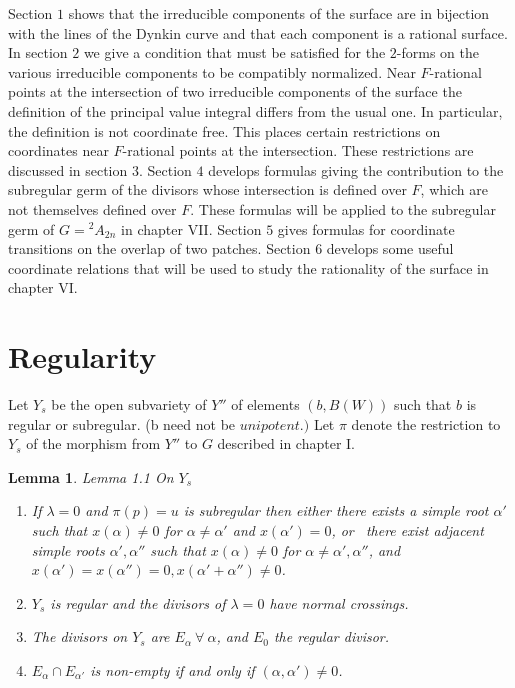 \documentclass{memo-l}
\newtheorem{lemma}[theorem]{Lemma}
\theoremstyle{definition}
\theoremstyle{remark}
\numberwithin{section}{chapter}
\numberwithin{equation}{chapter}
\begin{document}
   Section $1$ shows that the irreducible components of the surface are in
bijection with the lines of the Dynkin curve and that each component is a
rational surface.  In section $2$ we give a condition that must be
satisfied for the $2$-forms on the various irreducible components to be
compatibly normalized.  Near $F$-rational points at the intersection of two
irreducible components of the surface the definition of the principal value
integral differs from the usual one.  In particular, the definition is not
coordinate free.  This places certain restrictions on coordinates near
$F$-rational points at the intersection.  These restrictions are discussed
in section $3$.  Section $4$ develops formulas giving the contribution to
the subregular germ of the divisors whose intersection is defined over $F$,
which are not themselves defined over $F$.  These formulas will be applied
to the subregular germ of $G  =  {}^{2}A_{2n}$ in chapter VII.  Section $5$
gives formulas for coordinate transitions on the overlap of two patches.
Section $6$ develops some useful coordinate relations that will be used to
study the rationality of the surface in chapter VI.


\section{Regularity}

   Let $Y_{s}$ be the open subvariety of $Y''$ of elements $(b,B(W))$ such
that $b$ is regular or subregular.  (b need not be $unipotent.)$ Let
${\pi}$ denote the restriction to $Y_{s}$ of the morphism from $Y''$ to $G$
described in chapter I.

\begin{lemma}{Lemma 1.1} On $Y_{s}$
\begin{enumerate}[label=\alph*)]
\item If ${\lambda}  =  0$ and ${\pi}(p)  =  u$ is subregular then either
 there exists a simple root ${\alpha}'$ such that $x({\alpha})\ne 0$ for
${\alpha}\ne {\alpha}'$ and $x({\alpha}')  =  0$, or
\ there exist adjacent simple roots ${\alpha}',{\alpha''}$ such that
$x({\alpha})\ne 0$ for ${\alpha}\ne {\alpha}',{\alpha''}$, and
$x({\alpha}')  =  x({\alpha''})  =  0, x({\alpha}'+{\alpha''})\ne 0$.
\item $Y_{s}$ is regular and the divisors of ${\lambda}  =  0$ have normal
crossings.
\item The divisors on $Y_{s}$ are $E_{{\alpha}} {\ \forall\ } {\alpha}$, and
$E_{0}$ the regular divisor.
\item $E_{{\alpha}} \cap E_{{\alpha}'}$ is non-empty if and only if
$({\alpha},{\alpha}') \ne 0$.
\end{enumerate}
\end{lemma}
\end{document}
